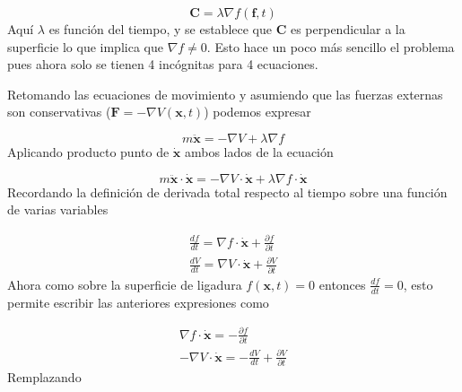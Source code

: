 \begin{enumerate}
            \begin{equation*}
                \mathbf{C} = \lambda\nabla f(\mathbf{f},t)
            \end{equation*}
            Aquí $\lambda$ es función del tiempo, y se establece que $\mathbf{C}$ es perpendicular a la superficie lo que implica que $\nabla f \neq 0$. Esto hace un poco más sencillo el problema pues ahora solo se tienen 4 incógnitas para 4 ecuaciones.


            Retomando las ecuaciones de movimiento y asumiendo que las fuerzas externas son conservativas ($\mathbf{F} = -\nabla V(\mathbf{x},t)$) podemos expresar 

            \begin{equation*}
                m\ddot{\mathbf{x}} = -\nabla V + \lambda\nabla f
            \end{equation*}
            Aplicando producto punto de $\dot{\mathbf{x}}$ ambos lados de la ecuación

            \begin{equation*}
                m\ddot{\mathbf{x}}\cdot \dot{\mathbf{x}} = -\nabla V \cdot \dot{\mathbf{x}}+ \lambda\nabla f \cdot \dot{\mathbf{x}}
            \end{equation*}
            Recordando la definición de derivada total respecto al tiempo sobre una función de varias variables 

            \begin{gather*}
                \frac{df}{dt} = \nabla f \cdot \dot{\mathbf{x}} + \frac{\partial f}{\partial t}\\
                \frac{dV}{dt} = \nabla V \cdot \dot{\mathbf{x}} + \frac{\partial V}{\partial t}
            \end{gather*}
            Ahora como sobre la superficie de ligadura $f(\mathbf{x},t) = 0$ entonces $\frac{df}{dt} = 0$, esto permite escribir las anteriores expresiones como 

            \begin{gather*}
                \nabla f \cdot \mathbf{\dot{x}}=  - \frac{\partial f}{\partial t}\\
                -\nabla V\cdot \dot{\mathbf{x}} = -\frac{dV}{dt} + \frac{\partial V}{\partial t}
            \end{gather*}
            Remplazando 


\end{enumerate}
